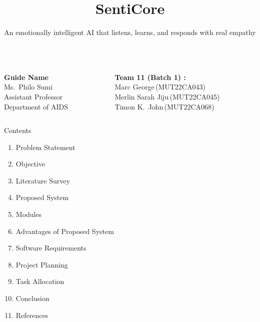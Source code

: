 \documentclass[aspectratio=169]{beamer}
\title{SentiCore}
\subtitle{An emotionally intelligent AI that listens, learns, and responds with real empathy }
\author{}
\date{}
\begin{document}
\begin{frame}
    \vspace{1cm}
    \titlepage
    \subtitle
    \vfill
    \begin{columns}[t]
        \begin{column}{0.5\textwidth}
            \begin{flushleft}
                \textbf{Guide Name} \\ 
                Ms.\ Philo Sumi \\ 
                Assistant Professor\\
                Department of AIDS
            \end{flushleft}
        \end{column}
        \begin{column}{0.5\textwidth}
            \begin{flushright}\small
                \textbf{Team 11 (Batch 1) :}\\[0.5ex]
                Marc George\,(MUT22CA043)\\ 
                Merlin Sarah Jiju\,(MUT22CA045)\\
                Timon K.\ John\,(MUT22CA068)\\[1ex]
            \end{flushright}
        \end{column}
    \end{columns}
\end{frame}


\begin{frame}{Contents}
    \begin{enumerate}
        \item Problem Statement
        \item Objective
        \item Literature Survey
        \item Proposed System
        \item Modules
        \item Advantages of Proposed System
        \item Software Requirements
        \item Project Planning
        \item Task Allocation
        \item Conclusion
        \item References
    \end{enumerate}
\end{frame}
\end{document}
